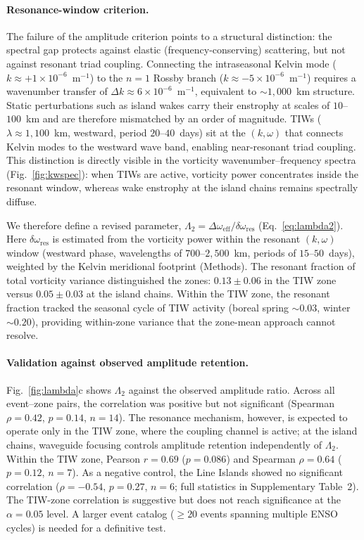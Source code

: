 \documentclass[11pt]{article}
\begin{document}
\paragraph{Resonance-window criterion.}
The failure of the amplitude criterion points to a structural distinction: the spectral gap protects against elastic (frequency-conserving) scattering, but not against resonant triad coupling. Connecting the intraseasonal Kelvin mode ($k \approx +1 \times 10^{-6}$~m$^{-1}$) to the $n = 1$ Rossby branch ($k \approx -5 \times 10^{-6}$~m$^{-1}$) requires a wavenumber transfer of $\Delta k \approx 6 \times 10^{-6}$~m$^{-1}$, equivalent to ${\sim}1{,}000$~km structure. Static perturbations such as island wakes carry their enstrophy at scales of $10$--$100$~km and are therefore mismatched by an order of magnitude. TIWs ($\lambda \approx 1{,}100$~km, westward, period $20$--$40$~days\cite{KennanFlament2000}) sit at the $(k, \omega)$ that connects Kelvin modes to the westward wave band, enabling near-resonant triad coupling\cite{Lyman2005}. This distinction is directly visible in the vorticity wavenumber--frequency spectra (Fig.~\ref{fig:kwspec}): when TIWs are active, vorticity power concentrates inside the resonant window, whereas wake enstrophy at the island chains remains spectrally diffuse.

We therefore define a revised parameter, $\Lambda_2 = \Delta\omega_\mathrm{eff} / \delta\omega_\mathrm{res}$ (Eq.~\ref{eq:lambda2}). Here $\delta\omega_\mathrm{res}$ is estimated from the vorticity power within the resonant $(k, \omega)$ window (westward phase, wavelengths of $700$--$2{,}500$~km, periods of $15$--$50$~days), weighted by the Kelvin meridional footprint (Methods). The resonant fraction of total vorticity variance distinguished the zones: $0.13 \pm 0.06$ in the TIW zone versus $0.05 \pm 0.03$ at the island chains. Within the TIW zone, the resonant fraction tracked the seasonal cycle of TIW activity (boreal spring ${\sim}0.03$, winter ${\sim}0.20$), providing within-zone variance that the zone-mean approach cannot resolve.

\paragraph{Validation against observed amplitude retention.}
Fig.~\ref{fig:lambda}c shows $\Lambda_2$ against the observed amplitude ratio. Across all event--zone pairs, the correlation was positive but not significant (Spearman $\rho = 0.42$, $p = 0.14$, $n = 14$). The resonance mechanism, however, is expected to operate only in the TIW zone, where the coupling channel is active; at the island chains, waveguide focusing controls amplitude retention independently of $\Lambda_2$. Within the TIW zone, Pearson $r = 0.69$ ($p = 0.086$) and Spearman $\rho = 0.64$ ($p = 0.12$, $n = 7$). As a negative control, the Line Islands showed no significant correlation ($\rho = -0.54$, $p = 0.27$, $n = 6$; full statistics in Supplementary Table~2). The TIW-zone correlation is suggestive but does not reach significance at the $\alpha = 0.05$ level. A larger event catalog ($\geq 20$ events spanning multiple ENSO cycles) is needed for a definitive test.
\end{document}
